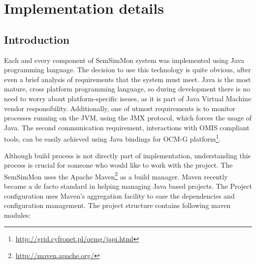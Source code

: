 %
\chapter{Implementation details}
\label{cha:implementation}



\section{Introduction}

Each and every component of SemSimMon system was implemented using Java programming language. The decision to use this technology is quite obvious, after even a brief analysis of requirements that the system must meet. Java is the most mature, cross platform programming language, so during development there is no need to worry about platform-specific issues, as it is part of Java Virtual Machine vendor responsibility. Additionally, one of utmost requirements is to monitor processes running on the JVM, using the JMX protocol, which forces the usage of Java. The second communication requirement, interactions with OMIS compliant tools, can be easily achieved using Java bindings for OCM-G platform\footnote{\url{http://grid.cyfronet.pl/ocmg/japi.html}}.

Although build process is not directly part of implementation, understanding this process is crucial for someone who would like to work with the project. The SemSimMon uses the Apache Maven\footnote{\url{http://maven.apache.org/}} as a build manager. Maven recently became a de facto standard in helping managing Java based projects. The Project configuration uses Maven's aggregation facility to ease the dependencies and configuration management. The project structure contains following maven modules: 

